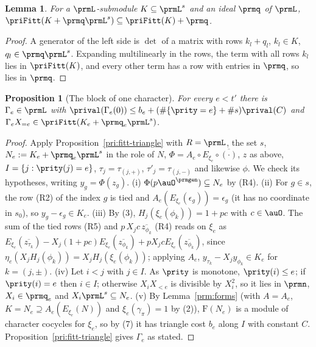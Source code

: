 \documentclass[10pt]{amsart}
\newtheorem{proposition}[theorem]{Proposition}
\newtheorem{lemma}[theorem]{Lemma}
\theoremstyle{definition}
\theoremstyle{remark}
\begin{document}
\begin{lemma}\label{prm:fittsum}
For a $\prmL$-submodule $K\subseteq\prmL^s$ and an ideal $\prmq$ of $\prmL$, $\priFitt(K+\prmq\prmL^s)
\subseteq\priFitt(K)+\prmq$.
\end{lemma}
\begin{proof}
A generator of the left side is $\det$ of a matrix with rows $k_l+q_l$, $k_l\in K$, $q_l\in\prmq
\prmL^s$. Expanding multilinearly in the rows, the term with all rows $k_l$ lies in $\priFitt(K)$, and
every other term has a row with entries in $\prmq$, so lies in $\prmq$.
\end{proof}

\begin{proposition}[The block of one character]\label{prm:block}
For every $e<t'$ there is $\Gamma_e\in\prmL$ with
$\prival(\Gamma_e(0))\le b_e+(\#\{\prity=e\}+\#s)\prival(C)$ and $\Gamma_eX_{=e}\in\priFitt(K_e+
\prmq_e\prmL^s)$.
\end{proposition}
\begin{proof}
Apply Proposition~\ref{pri:fitt-triangle} with $R=\prmL$, the set $s$, $N_e:=K_e+\prmq_e\prmL^s$ in the
role of $N$, $\Phi=A_e\circ E_{\xi_e}\circ\overline{(\cdot)}$, $z$ as above, $I=\{j:\prity(j)=e\}$,
$\tau_j=\tau_{(j,+)}$, $\tau'_j=\tau_{(j,-)}$ and likewise $\phi$. We check its hypotheses, writing
$y_g=\Phi(z_g)$. (i) $\Phi(p\auO^{\prmgen})\subseteq N_e$ by (R4). (ii) For $g\in s$, the row (R2) of
the index $g$ is tied and $A_e(E_{\xi_e}(\epsilon_g))=\epsilon_g$ (it has no coordinate in $s_0$), so
$y_g-\epsilon_g\in K_e$. (iii) By (3), $H_j(\xi_e(\phi_k))=1+pc$ with $c\in\auO$. The sum of the tied
rows (R5) and $p\,X_jc\,\overline{z_{\phi_k}}$ (R4) reads on $\xi_e$ as $E_{\xi_e}(\overline{z_{\tau_k}})
-X_j(1+pc)E_{\xi_e}(\overline{z_{\phi_k}})+pX_jcE_{\xi_e}(\overline{z_{\phi_k}})$, since $\eta_e(X_j
H_j(\phi_k))=X_jH_j(\xi_e(\phi_k))$; applying $A_e$, $y_{\tau_k}-X_jy_{\phi_k}\in K_e$ for $k=(j,\pm)$.
(iv) Let $i<j$ with $j\in I$. As $\prity$ is monotone, $\prity(i)\le e$; if $\prity(i)=e$ then $i\in I$;
otherwise $X_iX_{<e}$ is divisible by $X_i^2$, so it lies in $\prmn$, $X_i\in\prmq_e$ and
$X_i\prmL^s\subseteq N_e$. (v) By Lemma~\ref{prm:forms} (with $A=A_e$, $K=N_e\supseteq A_e(E_{\xi_e}(N))$
and $\xi_e(\gamma_\pi)=1$ by (2)), $\mathrm F(N_e)$ is a module of character cocycles for $\xi_e$, so by
(7) it has triangle cost $b_e$ along $I$ with constant $C$. Proposition~\ref{pri:fitt-triangle} gives
$\Gamma_e$ as stated.
\end{proof}
\end{document}
